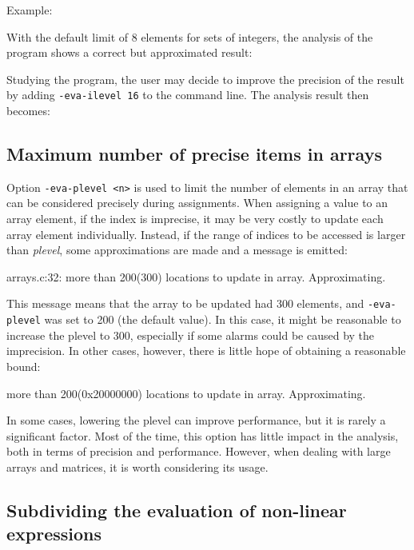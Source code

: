 \documentclass{frama-c-book}
\begin{document}
Example:

With the default limit of 8 elements for sets of integers, the
analysis of the program shows a correct but approximated result:


Studying the program, the user may decide to improve the precision of
the result by adding \verb|-eva-ilevel 16| to the command line. The
analysis result then becomes:


\subsection{Maximum number of precise items in arrays}

Option \verb|-eva-plevel <n>| is used to limit the number of elements
in an array that can be considered precisely during assignments.
When assigning a value to an array element, if the index is imprecise,
it may be very costly to update each array element individually.
Instead, if the range of indices to be accessed is larger than {\em plevel},
some approximations are made and a message is emitted:

\begin{listing-log}
 arrays.c:32:
  more than 200(300) locations to update in array. Approximating.
\end{listing-log}

This message means that the array to be updated had 300 elements, and
\verb|-eva-plevel| was set to 200 (the default value). In this case, it
might be reasonable to increase the plevel to 300, especially if some alarms
could be caused by the imprecision. In other cases, however, there is little
hope of obtaining a reasonable bound:

\begin{listing-log}
more than 200(0x20000000) locations to update in array. Approximating.
\end{listing-log}

In some cases, lowering the plevel can improve performance, but it is rarely
a significant factor. Most of the time, this option has little impact in the
analysis, both in terms of precision and performance. However, when dealing
with large arrays and matrices, it is worth considering its usage.


\subsection{Subdividing the evaluation of non-linear expressions}
\label{subdividing-evaluation}
\end{document}
